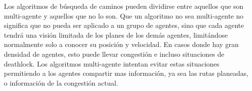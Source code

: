 Los algoritmos de búsqueda de caminos pueden dividirse entre aquellos que son
multi-agente y aquellos que no lo son. Que un algoritmo no sea multi-agente no
significa que no pueda ser aplicado a un grupo de agentes, sino que cada agente
tendrá una visión limitada de los planes de los demás agentes, limitándose
normalmente solo a conocer su posición y velocidad. En casos donde hay gran
densidad de agentes, esto puede llevar congestión e incluso situaciones de
deathlock. Los algoritmos multi-agente intentan evitar estas situaciones
permitiendo a los agentes compartir mas información, ya sea las rutas planeadas,
o información de la congestión actual.
